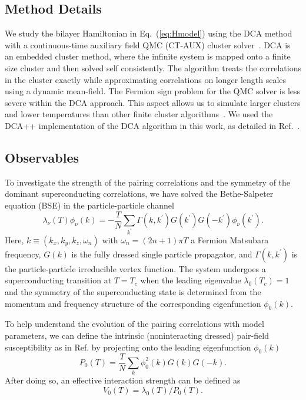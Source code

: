 \documentclass[prb,twocolumn,amsmath,amssymb,superscriptaddress,floatfix,nofootinbib]{revtex4-2}
\begin{document}
\subsection{Method Details}
We study the bilayer Hamiltonian in Eq.~(\ref{eq:Hmodel}) using the DCA method~\cite{Jarrell2001, Maier_Review} with a 
continuous-time auxiliary field QMC (CT-AUX) cluster solver~\cite{Gull_2008, Gull2011}.   
DCA is an embedded cluster method, where the infinite system is mapped onto a finite size cluster and then solved self consistently. The algorithm treats the correlations in the cluster exactly while approximating correlations on longer length scales using a dynamic mean-field. The Fermion sign problem for the QMC solver is less severe within the DCA approach. This aspect allows us to simulate larger clusters and lower temperatures than other finite cluster algorithms~\cite{Jarrell2001}. We used the DCA++ implementation of the DCA algorithm in this work, 
as detailed in Ref.~. 

\subsection{Observables}
To investigate the strength of the pairing correlations and the symmetry of the dominant superconducting correlations, we have solved the Bethe-Salpeter equation (BSE) in the particle-particle channel \cite{Maier2006}
\begin{equation}
    \lambda_\nu(T) \phi_\nu(k) = - \frac{T}{N} \sum_{k^\prime} \Gamma(k,k^\prime) G(k^\prime) G(-k^\prime) \phi_\nu(k^\prime).
    \label{eq:BSEeq}
\end{equation}
Here, $k\equiv(k_x,k_y,k_z,\omega_n)$ with $\omega_n=(2n+1)\pi T$ a Fermion Matsubara frequency, $G(k)$ is the fully dressed single particle propagator, and $\Gamma(k,k^\prime)$ is the particle-particle irreducible vertex function. The system undergoes a superconducting transition at $T=T_c$ when the leading eigenvalue $\lambda_0(T_c) = 1$ and the symmetry of the superconducting state is determined from the momentum and frequency structure of the corresponding eigenfunction $\phi_0(k)$.

To help understand the evolution of the pairing correlations with model parameters, we can define the intrinsic (noninteracting dressed) pair-field susceptibility as in Ref.  
by projecting onto the leading eigenfunction $\phi_0(k)$ 
\begin{equation}\label{eq:P0}
    P_0(T) = \frac{T}{N} \sum_k \phi_0^2(k) G(k) G(-k).
\end{equation}
After doing so, an effective interaction strength can be defined as 
\begin{equation}\label{eq:V}
    V_0(T) = \lambda_0(T)/P_0(T).
\end{equation}
\end{document}
